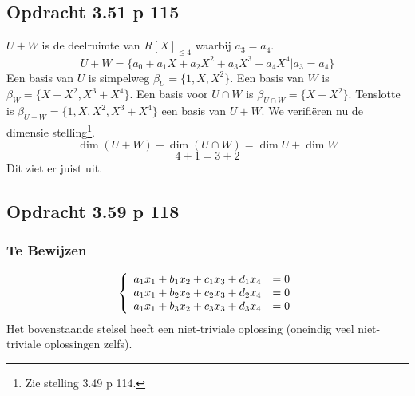 \documentclass[lineaire_algebra_oplossingen.tex]{subfiles}
\begin{document}








\subsection{Opdracht 3.51 p 115}
\label{3.51}
$U+W$ is de deelruimte van $R[X]_{\le4}$ waarbij $a_3 = a_4$.
\[U+W = \{a_0 + a_1 X + a_2 X^2 +a_3 X^3 + a_4 X^4 | a_3 = a_4\}\]
Een basis van $U$ is simpelweg $\beta_U = \{1,X,X^2\}$. Een basis van $W$ is $\beta_W = \{X+X^2,X^3+X^4\}$. Een basis voor $U\cap W$ is $\beta_{U\cap W} = \{X+X^2\}$. Tenslotte is $\beta_{U+W} = \{1,X,X^2,X^3+X^4\}$ een basis van $U+W$. We verifi\"eren nu de dimensie stelling\footnote{Zie stelling 3.49 p 114.}.
\[
\dim(U+W) + \dim(U \cap W) = \dim U+\dim W
\]
\[
4 + 1 = 3+2
\]
Dit ziet er juist uit.


%



\subsection{Opdracht 3.59 p 118}
\label{3.59}
\subsubsection*{Te Bewijzen}
\[
\left\lbrace
\begin{array}{c c}
a_1x_1 + b_1x_2 + c_1x_3 + d_1x_4 &= 0 \\
a_1x_1 + b_2x_2+ c_2x_3 + d_2x_4 &= 0 \\
a_1x_1 + b_3x_2+ c_3x_3 + d_3x_4 &= 0 \\
\end{array}
\right.
\]
Het bovenstaande stelsel heeft een niet-triviale oplossing (oneindig veel niet-triviale oplossingen zelfs).
\end{document}
